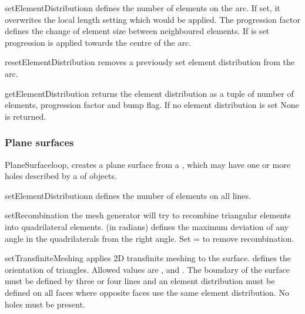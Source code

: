 \begin{methoddesc}[Arc]{setElementDistribution}{n}
defines the number of elements on the arc. If set, it overwrites the local
length setting which would be applied.
The progression factor  defines the change of element size
between neighboured elements. If  is set progression is
applied towards the centre of the arc.
\end{methoddesc}

\begin{methoddesc}[Arc]{resetElementDistribution}{}
removes a previously set element distribution from the arc.
\end{methoddesc}

\begin{methoddesc}[Arc]{getElementDistribution}{}
returns the element distribution as a tuple of number of elements, progression
factor and bump flag. If no element distribution is set None is returned.
\end{methoddesc}

\subsubsection{Plane surfaces}
\begin{classdesc}{PlaneSurface}{loop, }
creates a plane surface from a , which may have one or more
holes described by a  of  objects.
\end{classdesc}

\begin{methoddesc}[PlaneSurface]{setElementDistribution}{n}
defines the number of elements on all lines.
\end{methoddesc}

\begin{methoddesc}[PlaneSurface]{setRecombination}{}
the mesh generator will try to recombine triangular elements into
quadrilateral elements.  (in radians) defines the
maximum deviation of any angle in the quadrilaterals from the right angle.
Set = to remove recombination.
\end{methoddesc}

\begin{methoddesc}[PlaneSurface]{setTransfiniteMeshing}{}
applies 2D transfinite meshing to the surface.
 defines the orientation of triangles. Allowed values
are ,  and .
The boundary of the surface must be defined by three or four lines and an
element distribution must be defined on all faces where opposite
faces use the same element distribution. No holes must be present.
\end{methoddesc}

